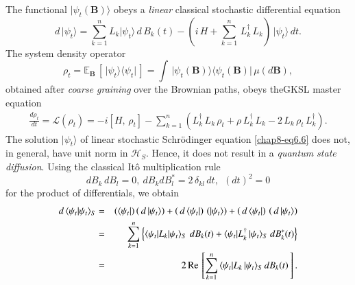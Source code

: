 The functional $\vert\psi_t(\mathbf{B})\rangle$ obeys a {\em linear} classical stochastic differential equation 
\begin{equation}
d\, \vert\psi_t\rangle=  \sum_{k=1}^n L_k \vert\psi_t\rangle\, d\,B_k(t)-( i\, H + \sum_{k=1}^n\, L^\dag_k\, L_k)\, \vert\psi_t\rangle\, dt. \label{chap8-eq6.6}
\end{equation}      
The system density operator 
\begin{equation}
\rho_t=\mathbb{E}_\mathbf{B}\,[\,\vert\psi_t\rangle\langle \psi_t\vert\,]=\int\, 
\vert\psi_t(\mathbf{B})\rangle\langle\psi_t(\mathbf{B})\vert\, \mu(d\mathbf{B}), \label{chap8-eq6.7}
\end{equation}
obtained after {\em coarse graining} over the Brownian paths,  obeys the\break  GKSL master equation 
\begin{eqnarray}
\frac{d \rho_t}{dt} =\mathcal{L}(\rho_t)= -i [H,\, \rho_t]- \sum_{k=1}^{n}\left(L^\dag_k\, L_k\, \rho_t + \rho\, L^\dag_k\, L_k - 2\, L_k\, \rho_t\, L^\dag_k\right). \label{chap8-eq6.8}
\end{eqnarray}
The solution $\vert\psi_t\rangle$ of linear stochastic Schr{\"o}dinger equation \eqref{chap8-eq6.6} does not, in general, have unit norm in $\mathcal{H}_S$. Hence, it  does not result in  a {\em quantum state diffusion}. Using the classical It{\^o} multiplication rule~\cite{chap8-key38}
\begin{equation}
dB_k\,dB_l=0, \ dB_k dB^*_l=2\,\delta_{kl}\, dt,\ \ (dt)^2=0 \label{chap8-eq6.9}
\end{equation} 
for the product of differentials, we obtain 
\begin{eqnarray} 
d\, \langle \psi_t\vert \psi_t\rangle_S &=&  (\langle \psi_t\vert) 
\left(\, d\, \vert\psi_t\rangle\right) + \left(\,d\, \langle \psi_t\vert\right)\,  (\vert \psi_t\rangle)
+ \left(\,d\, \langle \psi_t\vert\right)\, \left(\,d\, \vert \psi_t\rangle\right)  \nonumber \\ 
&=& \sum_{k=1}^{n}\left\{\langle \psi_t\vert L_k\vert\psi_t\rangle_S\,\, dB_k(t) + 
\langle \psi_t\vert L_k^\dag\,\vert\psi_t\rangle_S\ dB_k^*(t)\right\} \nonumber \\ 
&=& 2\, {\rm Re}\, \left[\sum_{k=1}^n\,\langle \psi_t\vert L_k\,\vert\psi_t\rangle_S\, dB_k(t)\,\right]. \label{chap8-eq6.10}
\end{eqnarray}   


